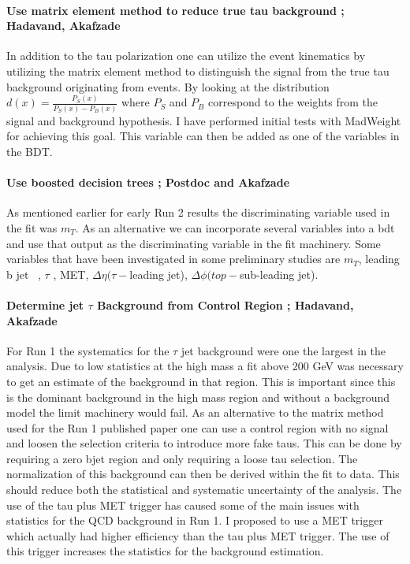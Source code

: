 \paragraph{Use matrix element method to reduce true tau background ;  Hadavand, Akafzade}
In addition to the tau polarization one can utilize the event kinematics by utilizing the matrix element method to distinguish the signal from the true tau background originating from \ttbar events.  
By looking at the distribution $d(x)=\frac{P_S(x)}{P_S(x)-P_B(x)}$ where $P_S$ and $P_B$ correspond to the weights from the signal and background 
hypothesis. I have performed initial tests with MadWeight for achieving this goal. This variable can then be added as one of the variables in the BDT. 

\paragraph{Use boosted decision trees ;  Postdoc and Akafzade}
As mentioned earlier for early Run 2 results the discriminating variable used in the fit was $m_T$. As an alternative we can incorporate several 
variables into a bdt and use that output as the discriminating variable in the fit machinery.  Some variables that have been investigated in some preliminary studies
are $m_T$, leading b jet \pt\ , $\tau$ \pt, MET, $\Delta \eta(\tau-$leading jet), $\Delta \phi(top-$sub-leading jet).

\paragraph{Determine jet \too $\tau$ Background from Control Region ;  Hadavand, Akafzade}  %
For Run 1 the systematics for the $\tau$ \too jet background were one the largest in the analysis.  Due to low statistics at the high mass a fit above 200 GeV was necessary to get 
an estimate of the background in that region.  This is important since this is the dominant background in the high mass region and without a background model the limit machinery would fail.
As an alternative to the matrix method used for the Run 1 published paper one can use a control region with no signal and loosen the selection criteria to introduce more fake taus.  This can be done
by requiring a zero bjet region and only requiring a loose tau selection.  The normalization of this background can then be derived within the fit to data.  This should reduce both the statistical and systematic uncertainty of the analysis.
The use of the tau plus MET trigger has caused some of the main issues with statistics for the QCD background in Run 1. I proposed to use a MET trigger which actually had higher efficiency than the tau plus MET trigger.  
The use of this trigger increases the statistics for the background estimation.


